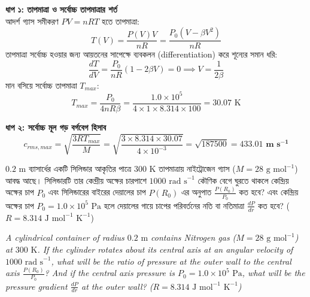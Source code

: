 \documentclass[12pt, a4paper]{article}
\begin{document}
\begin{tcolorbox}[solutionbox={সমাধান (Solution)}]
    \noindent
    \textbf{ধাপ ১: তাপমাত্রা ও সর্বোচ্চ তাপমাত্রার শর্ত} \\
    আদর্শ গ্যাস সমীকরণ $PV = nRT$ হতে তাপমাত্রা:
    \[ T(V) = \frac{P(V) V}{n R} = \frac{P_0 (V - \beta V^2)}{n R} \]
    তাপমাত্রা সর্বোচ্চ হওয়ার জন্য আয়তনের সাপেক্ষে ব্যবকলন (differentiation) করে শূন্যের সমান ধরি:
    \[ \frac{dT}{dV} = \frac{P_0}{n R} (1 - 2 \beta V) = 0 \implies V = \frac{1}{2 \beta} \]
    মান বসিয়ে সর্বোচ্চ তাপমাত্রা $T_{max}$:
    \[ T_{max} = \frac{P_0}{4 n R \beta} = \frac{1.0 \times 10^5}{4 \times 1 \times 8.314 \times 100} = 30.07\text{ K} \]
    
    \vspace{0.4em}
    \noindent\textbf{ধাপ ২: সর্বোচ্চ মূল গড় বর্গবেগ হিসাব}
    \[ c_{rms, max} = \sqrt{\frac{3 R T_{max}}{M}} = \sqrt{\frac{3 \times 8.314 \times 30.07}{4 \times 10^{-3}}} = \sqrt{187500} = \mathbf{433.01\text{ m s}^{-1}} \]
\end{tcolorbox}
\begin{tcolorbox}[questionbox={প্রশ্ন (Question) 13}]
    \noindent
    $0.2\text{ m}$ ব্যাসার্ধের একটি সিলিন্ডার আকৃতির পাত্রে $300\text{ K}$ তাপমাত্রায় নাইট্রোজেন গ্যাস ($M = 28\text{ g mol}^{-1}$) আবদ্ধ আছে। সিলিন্ডারটি তার কেন্দ্রীয় অক্ষের চারপাশে $1000\text{ rad s}^{-1}$ কৌণিক বেগে ঘুরতে থাকলে কেন্দ্রিয় অক্ষের চাপ $P_0$ এবং সিলিন্ডারের বাইরের দেয়ালের চাপ $P(R_0)$ এর অনুপাত $\frac{P(R_0)}{P_0}$ কত হবে? এবং কেন্দ্রিয় অক্ষের চাপ $P_0 = 1.0 \times 10^5\text{ Pa}$ হলে দেয়ালের গায়ে চাপের পরিবর্তনের নতি বা নতিমাত্রা $\frac{dP}{dr}$ কত হবে? ($R = 8.314\text{ J mol}^{-1}\text{ K}^{-1}$)
    
    \vspace{0.8em}
    \begin{english}
    \noindent\textit{\color{darkgray}
    A cylindrical container of radius $0.2\text{ m}$ contains Nitrogen gas ($M = 28\text{ g mol}^{-1}$) at $300\text{ K}$. If the cylinder rotates about its central axis at an angular velocity of $1000\text{ rad s}^{-1}$, what will be the ratio of pressure at the outer wall to the central axis $\frac{P(R_0)}{P_0}$? And if the central axis pressure is $P_0 = 1.0 \times 10^5\text{ Pa}$, what will be the pressure gradient $\frac{dP}{dr}$ at the outer wall? ($R = 8.314\text{ J mol}^{-1}\text{ K}^{-1}$)
    }
    \end{english}
\end{tcolorbox}
\end{document}
